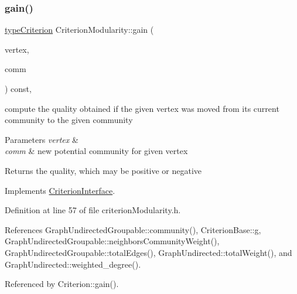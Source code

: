 \subsubsection{\texorpdfstring{gain()}{gain()}}
{\footnotesize\ttfamily \hyperlink{criterionInterface_8h_af71ff22f6355fd69a4a62104bfd59a83}{type\+Criterion} Criterion\+Modularity\+::gain (\begin{DoxyParamCaption}\item[{const \hyperlink{edge_8h_a5fbd20c46956d479cb10afc9855223f6}{type\+Vertex} \&}]{vertex,  }\item[{const \hyperlink{graphUndirectedGroupable_8h_a914da95c9ea7f14f4b7f875c36818556}{type\+Community} \&}]{comm }\end{DoxyParamCaption}) const\hspace{0.3cm}{\ttfamily [inline]}, {\ttfamily [virtual]}}

compute the quality obtained if the given vertex was moved from its current community to the given community


\begin{DoxyParams}{Parameters}
{\em vertex} & \\
\hline
{\em comm} & new potential community for given vertex \\
\hline
\end{DoxyParams}
\begin{DoxyReturn}{Returns}
the quality, which may be positive or negative 
\end{DoxyReturn}


Implements \hyperlink{classCriterionInterface_aa0beec8287cd70e16c057e7995d0caca}{Criterion\+Interface}.



Definition at line 57 of file criterion\+Modularity.\+h.



References Graph\+Undirected\+Groupable\+::community(), Criterion\+Base\+::g, Graph\+Undirected\+Groupable\+::neighbors\+Community\+Weight(), Graph\+Undirected\+Groupable\+::total\+Edges(), Graph\+Undirected\+::total\+Weight(), and Graph\+Undirected\+::weighted\+\_\+degree().



Referenced by Criterion\+::gain().

